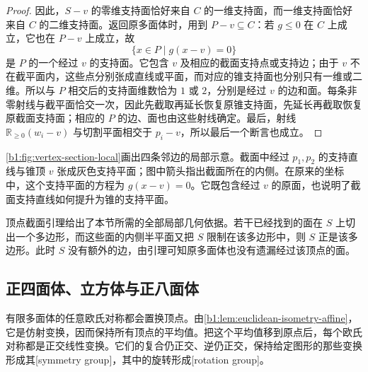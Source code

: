 \begin{proof}
	因此，\(S-v\) 的零维支持面恰好来自 \(C\) 的一维支持面，而一维支持面恰好来自 \(C\) 的二维支持面。返回原多面体时，用到 \(P-v\subseteq C\)：若 \(g\leq0\) 在 \(C\) 上成立，它也在 \(P-v\) 上成立，故
	\[
		\{x\in P\mid g(x-v)=0\}
	\]
	是 \(P\) 的一个经过 \(v\) 的支持面。它包含 \(v\) 及相应的截面支持点或支持边；由于 \(v\) 不在截平面内，这些点分别张成直线或平面，而对应的锥支持面也分别只有一维或二维。所以与 \(P\) 相交后的支持面维数恰为 \(1\) 或 \(2\)，分别是经过 \(v\) 的边和面。每条非零射线与截平面恰交一次，因此先截取再延长恢复原锥支持面，先延长再截取恢复原截面支持面；相应的 \(P\) 的边、面也由这些射线确定。最后，射线 \(\mathbb R_{\geq0}(w_i-v)\) 与切割平面相交于 \(p_i-v\)，所以最后一个断言也成立。
\end{proof}

\cref{b1:fig:vertex-section-local}画出四条邻边的局部示意。截面中经过 \(p_1,p_2\) 的支持直线与锥顶 \(v\) 张成灰色支持平面；图中箭头指出截面所在的内侧。在原来的坐标中，这个支持平面的方程为 \(g(x-v)=0\)。它既包含经过 \(v\) 的原面，也说明了截面支持直线如何提升为锥的支持平面。


顶点截面引理给出了本节所需的全部局部几何依据。若干已经找到的面在 \(S\) 上切出一个多边形，而这些面的内侧半平面又把 \(S\) 限制在该多边形中，则 \(S\) 正是该多边形。此时 \(S\) 没有额外的边，由引理可知原多面体也没有遗漏经过该顶点的面。

\subsection{正四面体、立方体与正八面体}
\label{b1:subsec:0304:01}

有限多面体的任意欧氏对称都会置换顶点。由\cref{b1:lem:euclidean-isometry-affine}，它是仿射变换，因而保持所有顶点的平均值。把这个平均值移到原点后，每个欧氏对称都是正交线性变换。它们的复合仍正交、逆仍正交，保持给定图形的那些变换形成其[symmetry group]，其中的旋转形成[rotation group]。

